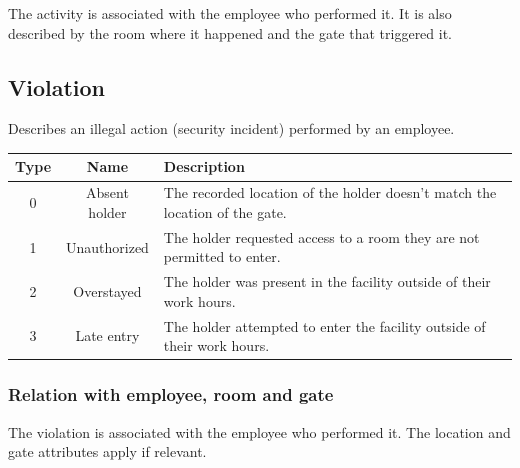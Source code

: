 \documentclass{article}
\begin{document}
	The activity is associated with the employee who performed it. It is also
	described by the room where it happened and the gate that triggered it.
	
	\subsection{Violation}
	
	Describes an illegal action (security incident) performed by an employee.
	
	\begin{center}
		\begin{tabular}{|c | c | p{10cm}|}
			\hline
			\textbf{Type} & \textbf{Name} & \textbf{Description} \\
			\hline
			0 & Absent holder & The recorded location of the holder doesn't match the location of the gate. \\
			\hline
			1 & Unauthorized & The holder requested access to a room they are not permitted to enter. \\
			\hline
			2 & Overstayed & The holder was present in the facility outside of their work hours. \\
			\hline
			3 & Late entry & The holder attempted to enter the facility outside of their work hours. \\
			\hline
		\end{tabular}
	\end{center}
	
	\subsubsection{Relation with employee, room and gate}
	
	The violation is associated with the employee who performed it. The
	location and gate attributes apply if relevant.
	
	
	
	
	
\end{document}
